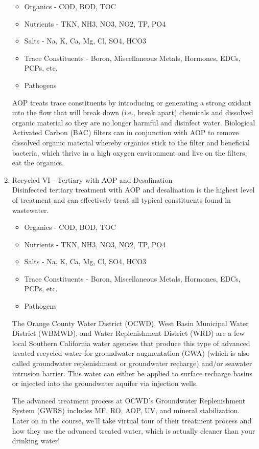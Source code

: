 \begin{enumerate}
\begin{itemize}
\item Organics - COD, BOD, TOC
\item Nutrients - TKN, NH3, NO3, NO2, TP, PO4
\item Salts - Na, K, Ca, Mg, Cl, SO4, HCO3
\item Trace Constituents - Boron, Miscellaneous Metals, Hormones, EDCs, PCPs, etc.
\item Pathogens
\end{itemize}

AOP treats trace constituents by introducing or generating a strong oxidant into the flow that will break down (i.e., break apart) chemicals and dissolved organic material so they are no longer harmful and disinfect water.  Biological Activated Carbon (BAC) filters can in conjunction with AOP to remove dissolved organic material whereby organics stick to the filter and beneficial bacteria, which thrive in a high oxygen environment and live on the filters, eat the organics.
 
\item Recycled VI - Tertiary with AOP and Desalination\\

Disinfected tertiary treatment with AOP and desalination is the highest level of treatment and can effectively treat all typical constituents found in wastewater. 
\begin{itemize}
\item Organics - COD, BOD, TOC
\item Nutrients - TKN, NH3, NO3, NO2, TP, PO4
\item Salts - Na, K, Ca, Mg, Cl, SO4, HCO3
\item Trace Constituents - Boron, Miscellaneous Metals, Hormones, EDCs, PCPs, etc.
\item Pathogens
\end{itemize}

The Orange County Water District (OCWD), West Basin Municipal Water District (WBMWD), and Water Replenishment District (WRD) are a few local Southern California water agencies that produce this type of advanced treated recycled water for groundwater augmentation (GWA) (which is also called groundwater replenishment or groundwater recharge) and/or seawater intrusion barrier.  This water can either be applied to surface recharge basins or injected into the groundwater aquifer via injection wells.

The advanced treatment process at OCWD's Groundwater Replenishment System (GWRS) includes MF, RO, AOP, UV, and mineral stabilization.  Later on in the course, we'll take virtual tour of their treatment process and how they use the advanced treated water, which is actually cleaner than your drinking water! 



\end{enumerate}